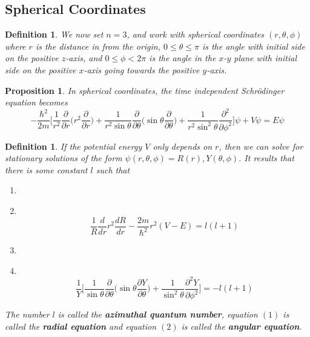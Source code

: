 \documentclass[12pt]{amsart}
\newtheorem{prop}[thm]{Proposition}
\newtheorem{defn}[thm]{Definition}
\newcommand{\sch}{Schr\"{o}dinger }
\newcommand\Item[1][]{%
  \ifx\relax#1\relax  \item \else \item[#1] \fi
  \abovedisplayskip=0pt\abovedisplayshortskip=0pt~\vspace*{-\baselineskip}}
\newcommand{\p}[1]{\frac{\partial}{\partial{#1}}}
\begin{document}
\subsection{Spherical Coordinates}
\begin{defn}
We now set $n=3$, and work with spherical coordinates $(r, \theta, \phi)$ where $r$ is the distance in from the origin, $0 \leq \theta \leq \pi$ is the angle with initial side on the positive $z$-axis, and $0 \leq \phi < 2\pi$ is the angle in the $x$-$y$ plane with initial side on the positive $x$-axis going towards the positive $y$-axis.
\end{defn}

\begin{prop}
In spherical coordinates, the time independent \sch equation becomes $$-\frac{\hbar^2}{2m}\bigg[ \frac{1}{r^2} \p{r}\bigg( r^2 \p{r}\bigg) + \frac{1}{r^2 \sin \theta} \p{\theta} \bigg( \sin \theta \p{\theta}\bigg) + \frac{1}{r^2 \sin^2 \theta} \frac{\partial^2}{\partial \phi^2}  \bigg] \psi + V \psi = E \psi$$
\end{prop}

\begin{defn}
If the potential energy $V$ only depends on $r$, then we can solve for stationary solutions of the form $\psi(r, \theta, \phi) = R(r), Y(\theta, \phi)$. It results that there is some constant $l$ such that 

\begin{enumerate}
\Item 
$$\frac{1}{R} \frac{d}{dr} r^2 \frac{dR}{dr} - \frac{2m}{\hbar^2}r^2(V -E) = l(l+1)$$ \vspace{3mm}
\Item 
$$\frac{1}{Y}\bigg[\frac{1}{\sin \theta}\p{\theta} \bigg(\sin \theta \frac{\partial Y}{\partial \theta} \bigg) + \frac{1}{\sin^2 \theta}\frac{\partial^2Y}{\partial \phi^2} \bigg] = -l(l+1)$$

\end{enumerate} \vspace{3mm}
The number $l$ is called the \textbf{azimuthal quantum number}, equation $(1)$ is called the \textbf{radial equation} and equation $(2)$ is called the \textbf{angular equation}. 
\end{defn}
\end{document}
